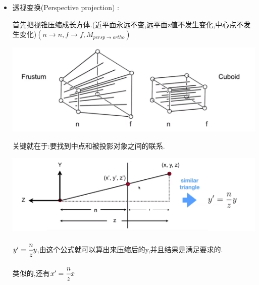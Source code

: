 \documentclass[UTF8,12pt]{ctexbook}
\begin{document}
{{{{{\begin{itemize}
{\begin{itemize}
{                        \begin{itemize}
                          \item 注意:由于视线方向沿着-z,所以$n>f$
                          \item 这就是为啥OpenGL用的是左手系
                        \end{itemize}
                        }
                  \item {
                        透视变换(Perspective projection) :

                        首先把视锥压缩成长方体.(近平面永远不变,远平面z值不发生变化,中心点不发生变化)$(n \to n,f \to f,M_{persp \to ortho})$

                        \includegraphics[scale=0.5]{resources/perspectiveProjection.png}

                        关键就在于:要找到中点和被投影对象之间的联系.

                        \includegraphics[scale=0.5]{resources/perspectiveProjection_middle.png}

                        $y^\prime = \cfrac{n}{z}y$,由这个公式就可以算出来压缩后的y,并且结果是满足要求的.

                        类似的,还有$x^\prime = \cfrac{n}{z}x$

}
\end{itemize}}
\end{itemize}}}}}}
\end{document}
